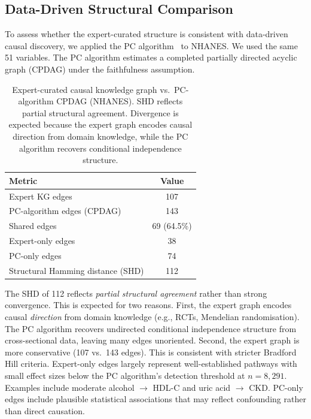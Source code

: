 \documentclass[runningheads]{llncs}
\begin{document}
\subsection{Data-Driven Structural Comparison}\label{sec:pcalg}

To assess whether the expert-curated structure is consistent with
data-driven causal discovery, we applied the PC
algorithm~\cite{spirtes2000causation} to NHANES.
We used the same 51 variables.
The PC algorithm estimates a completed partially directed acyclic
graph (CPDAG) under the faithfulness assumption.

\renewcommand{\arraystretch}{1.2}
\begin{table}[t]
\centering
\caption{Expert-curated causal knowledge graph vs.\ PC-algorithm
CPDAG (NHANES).
SHD reflects partial structural agreement.
Divergence is expected because the expert graph encodes causal
direction from domain knowledge, while the PC algorithm recovers
conditional independence structure.}\label{tab:pcalg}
\small
\begin{tabular}{@{}lc@{}}
\toprule
\textbf{Metric} & \textbf{Value} \\
\midrule
Expert KG edges                     & 107 \\
PC-algorithm edges (CPDAG)          & 143 \\
Shared edges                        & 69 (64.5\%) \\
Expert-only edges                   & 38 \\
PC-only edges                       & 74 \\
Structural Hamming distance (SHD)   & 112 \\
\bottomrule
\end{tabular}
\end{table}
\renewcommand{\arraystretch}{1.0}

The SHD of 112 reflects \emph{partial structural agreement} rather
than strong convergence.
This is expected for two reasons.
First, the expert graph encodes causal \emph{direction} from domain
knowledge (e.g., RCTs, Mendelian randomisation).
The PC algorithm recovers undirected conditional independence
structure from cross-sectional data, leaving many edges unoriented.
Second, the expert graph is more conservative (107 vs.\ 143 edges).
This is consistent with stricter Bradford Hill criteria.
Expert-only edges largely represent well-established pathways with
small effect sizes below the PC algorithm's detection threshold at
$n = 8{,}291$.
Examples include moderate alcohol $\rightarrow$ HDL-C and
uric acid $\rightarrow$ CKD\@.
PC-only edges include plausible statistical associations that may
reflect confounding rather than direct causation.
\end{document}
